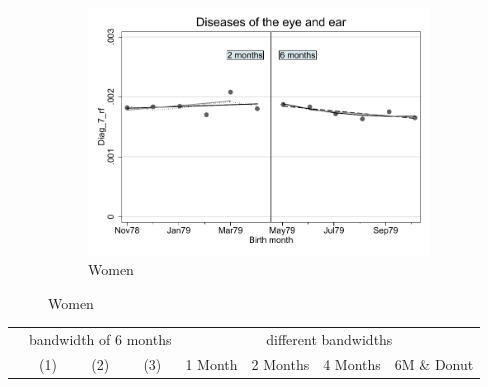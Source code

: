 \documentclass[a4paper ]{article}
\begin{document}
\begin{figure}[h]
\begin{subfigure}[t]{0.31\textwidth}
		\centering
		\includegraphics[width=0.99\textwidth]{R1_RD_Diag_7_rf_fits}
		\caption{Women}
	\end{subfigure}
\end{figure}


\begin{table}[h]\centering
\def\sym#1{\ifmmode^{#1}\else\(^{#1}\)\fi}
\begin{tabular}{l*{3}{c}|cccc}
\toprule
&\multicolumn{3}{c}{bandwidth of 6 months} & \multicolumn{4}{c}{different bandwidths} \\
 \cmidrule(lr{1em}){2-4} \cmidrule(lr{1em}){5-8}
 &\multicolumn{1}{c}{(1)}&\multicolumn{1}{c}{(2)}&\multicolumn{1}{c}{(3)}& 1 Month & 2 Months & 4 Months & 6M \& Donut \\
\midrule 

\bottomrule
\end{tabular}
\end{table}
\end{document}
